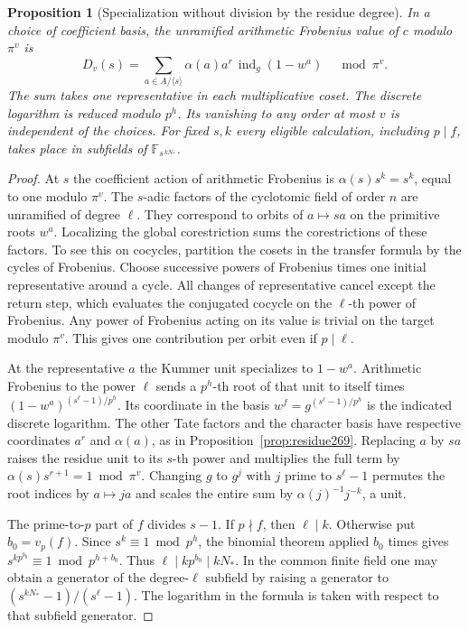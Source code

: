 \documentclass[a4paper,11pt]{article}
\newtheorem{proposition}{Proposition}[section]
\theoremstyle{definition}
\theoremstyle{remark}
\numberwithin{equation}{section}
\begin{document}
\begin{proposition}[Specialization without division by the residue degree]\leavevmode
\label{prop:orbits273}
In a choice of coefficient basis, the unramified arithmetic
Frobenius value of \(c\) modulo \(\pi^v\) is
\[
  D_v(s)=\sum_{a\in A/\langle s\rangle}
       \alpha(a)a^r\,\operatorname{ind}_{g}(1-w^a)
                       \quad\bmod\pi^v .
\]
The sum takes one representative in each multiplicative coset.
The discrete logarithm is reduced modulo \(p^h\).
Its vanishing to any order at most \(v\) is independent of the
choices. For fixed \(s,k\) every eligible calculation, including
\(p\mid f\), takes place in subfields of
\(\mathbb F_{s^{\,kN_*}}\).
\end{proposition}
\begin{proof}
At \(s\) the coefficient action of arithmetic Frobenius is
\(\alpha(s)s^k=s^k\), equal to one modulo \(\pi^v\).
The \(s\)-adic factors of the cyclotomic field of order \(n\)
are unramified of degree \(\ell\). They correspond to orbits
of \(a\mapsto sa\) on the primitive roots \(w^a\). Localizing
the global corestriction sums the corestrictions of these
factors. To see this on cocycles, partition the cosets in
the transfer formula by the cycles of Frobenius. Choose
successive powers of Frobenius times one initial representative
around a cycle. All changes of representative cancel except
the return step, which evaluates the conjugated cocycle on
the \(\ell\)-th power of Frobenius. Any power of Frobenius
acting on its value is trivial on the target modulo \(\pi^v\).
This gives one contribution per orbit even if \(p\mid\ell\).

At the representative \(a\) the Kummer unit specializes to
\(1-w^a\). Arithmetic Frobenius to the power \(\ell\) sends a
\(p^h\)-th root of that unit to itself times
\((1-w^a)^{(s^\ell-1)/p^h}\). Its coordinate in the basis
\(w^f=g^{(s^\ell-1)/p^h}\) is the indicated discrete logarithm.
The other Tate factors and the character basis have respective
coordinates \(a^r\) and \(\alpha(a)\), as in
Proposition~\ref{prop:residue269}. Replacing \(a\) by \(sa\)
raises the residue unit to its \(s\)-th power and multiplies
the full term by \(\alpha(s)s^{r+1}=1\bmod\pi^v\).
Changing \(g\) to \(g^j\) with \(j\) prime to \(s^\ell-1\)
permutes the root indices by \(a\mapsto ja\) and scales the
entire sum by \(\alpha(j)^{-1}j^{-k}\), a unit.

The prime-to-\(p\) part of \(f\) divides \(s-1\). If \(p\nmid f\),
then \(\ell\mid k\). Otherwise put \(b_0=v_p(f)\). Since
\(s^k\equiv1\bmod p^h\), the binomial theorem applied
\(b_0\) times gives \(s^{kp^{b_0}}\equiv1\bmod p^{h+b_0}\).
Thus \(\ell\mid k p^{b_0}\mid kN_*\). In the common finite
field one may obtain a generator of the degree-\(\ell\)
subfield by raising a generator to
\((s^{kN_*}-1)/(s^\ell-1)\). The logarithm in the formula is
taken with respect to that subfield generator.
\end{proof}
\end{document}
